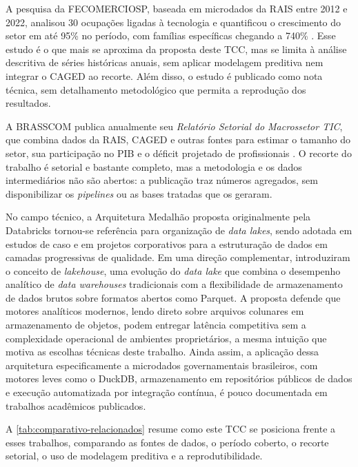 A pesquisa da FECOMERCIOSP, baseada em microdados da RAIS entre 2012 e 2022, analisou 30 ocupações ligadas à tecnologia e quantificou o crescimento do setor em até 95\% no período, com famílias específicas chegando a 740\% \cite{Fecomercio2024}. Esse estudo é o que mais se aproxima da proposta deste TCC, mas se limita à análise descritiva de séries históricas anuais, sem aplicar modelagem preditiva nem integrar o CAGED ao recorte. Além disso, o estudo é publicado como nota técnica, sem detalhamento metodológico que permita a reprodução dos resultados.

A BRASSCOM publica anualmente seu \textit{Relatório Setorial do Macrossetor TIC}, que combina dados da RAIS, CAGED e outras fontes para estimar o tamanho do setor, sua participação no PIB e o déficit projetado de profissionais \cite{Brasscom2024, Brasscom2025}. O recorte do trabalho é setorial e bastante completo, mas a metodologia e os dados intermediários não são abertos: a publicação traz números agregados, sem disponibilizar os \textit{pipelines} ou as bases tratadas que os geraram.

No campo técnico, a Arquitetura Medalhão proposta originalmente pela Databricks \cite{MicrosoftMedallion2024} tornou-se referência para organização de \textit{data lakes}, sendo adotada em estudos de caso e em projetos corporativos para a estruturação de dados em camadas progressivas de qualidade. Em uma direção complementar,  introduziram o conceito de \textit{lakehouse}, uma evolução do \textit{data lake} que combina o desempenho analítico de \textit{data warehouses} tradicionais com a flexibilidade de armazenamento de dados brutos sobre formatos abertos como Parquet. A proposta defende que motores analíticos modernos, lendo direto sobre arquivos colunares em armazenamento de objetos, podem entregar latência competitiva sem a complexidade operacional de ambientes proprietários, a mesma intuição que motiva as escolhas técnicas deste trabalho. Ainda assim, a aplicação dessa arquitetura especificamente a microdados governamentais brasileiros, com motores leves como o DuckDB, armazenamento em repositórios públicos de dados e execução automatizada por integração contínua, é pouco documentada em trabalhos acadêmicos publicados.

A \autoref{tab:comparativo-relacionados} resume como este TCC se posiciona frente a esses trabalhos, comparando as fontes de dados, o período coberto, o recorte setorial, o uso de modelagem preditiva e a reprodutibilidade.


